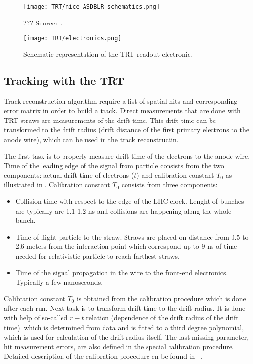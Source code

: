 \begin{figure}
\centering
\texttt{[image: TRT/nice\_ASDBLR\_schematics.png]}
\caption{ 
 ??? Source:~\cite{Aad:2008zzm}.
}
\label{fig:nice_asdblr_schematics}
\end{figure}


\begin{figure}
\centering
\texttt{[image: TRT/electronics.png]}
\caption{ 
 Schematic representation of the TRT readout electronic.
}
\label{fig:electronics}
\end{figure}



\subsection{Tracking with the TRT}

Track reconstruction algorithm require a list of spatial hits and corresponding error matrix in order to build a track.
Direct measurements that are done with TRT straws are measurements of the drift time. This drift time can be transformed to the
drift radius (drift distance of the first primary electrons to the anode wire), which can be used in the track reconstructin.

The first task is to properly measure drift time of the electrons to the anode wire. Time of the leading edge of the signal from particle
consists from the two components: actual drift time of electrons ($t$) and calibration constant $T_{0}$ as illustrated in .
Calibration constant $T_{0}$ consists from three components:
\begin{itemize}
 \item Collision time with respect to the edge of the LHC clock. Lenght of bunches are typically are 1.1-1.2 ns and collisions are happening along the whole bunch.
 \item Time of flight particle to the straw. Straws are placed on distance from 0.5 to 2.6 meters from the interaction point 
 which correspond up to 9 ns of time needed for relativistic particle to reach farthest straws.
 \item Time of the signal propagation in the wire to the front-end electronics. Typically a few nanoseconds.
\end{itemize}
Calibration constant $T_{0}$ is obtained from the calibration procedure which is done after each run.
Next task is to transform drift time to the drift radius. It is done with help of so-called $r-t$ relation (dependence of the drift radius of the drift time), 
which is determined from data and is fitted to a third degree polynomial, which is used for calculation of the drift radius itself.
The last missing parameter, hit measurement errors, are also defined in the special calibration procedure. Detailed description of the calibration procedure
cn be found in ~\cite{alonso_thesis}.


